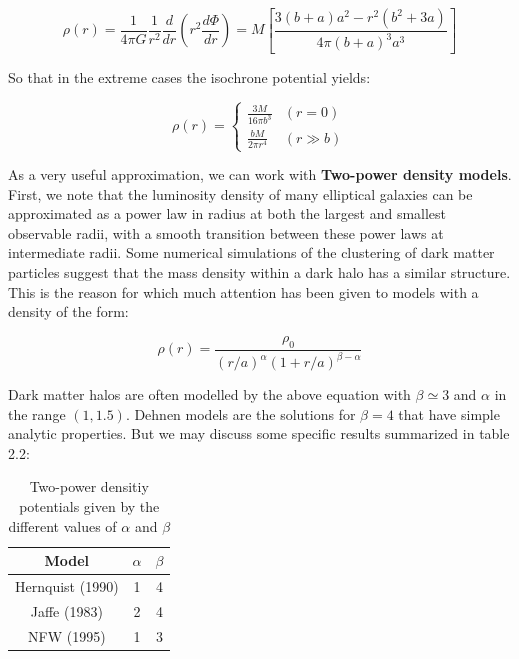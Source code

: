\begin{equation}
\rho(r)=\frac{1}{4\pi G}\frac{1}{r^{2}}\frac{d}{dr}\left(r^{2}\frac{d\Phi}{dr}\right)=M\left[\frac{3\left(b+a\right)a^{2}-r^{2}(b^{2}+3a)}{4\pi(b+a)^{3}a^{3}}\right]
\end{equation}

So that in the extreme cases the isochrone potential yields:

\begin{equation}
\rho(r) = \left\lbrace
\begin{array}{ll}
\frac{3M}{16\pi b^{3}} & (r=0)\\
\frac{bM}{2\pi r^{4}} & (r\gg b)
\end{array}
\right.
\end{equation} 

As a very useful approximation, we can work with \textbf{Two-power density models}. First, we note that the luminosity density of many elliptical galaxies can be approximated as a power law in radius at both the largest and smallest observable radii, with a smooth transition between these power laws at intermediate radii. Some numerical simulations of the clustering of dark matter particles suggest that the mass density within a dark halo has a similar structure. This is the reason for which much attention has been given to models with a density of the form:

\begin{equation}
\rho(r)=\frac{\rho_{0}}{\left(r/a\right)^{\alpha}\left(1+r/a\right)^{\beta-\alpha}}
\end{equation}

Dark matter halos are often modelled by the above equation with $\beta\simeq3$ and $\alpha$ in the range $(1,1.5)$. Dehnen models are the solutions for $\beta =4$ that have simple analytic properties. But we may discuss some specific results summarized in table 2.2:

\begin{table}[H]
\begin{center}
  \begin{tabular}{| c|  c|  c| }
    \hline
    \textbf{Model} & $\alpha $ & $\beta $ \\ \hline
    Hernquist (1990) & 1 & 4 \\ \hline
    Jaffe (1983) & 2 & 4 \\ \hline
    NFW (1995) & 1 & 3 \\
    \hline
  \end{tabular}
\end{center} 
\caption[Two power density potentials]{Two-power densitiy potentials given by the different values of $\alpha$ and $\beta$}
\end{table}

